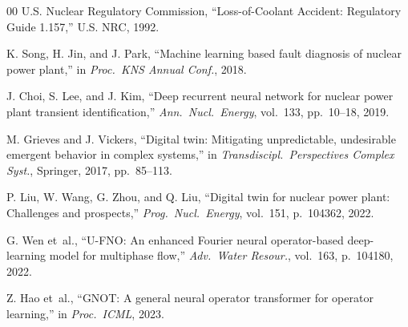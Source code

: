 \documentclass[conference]{IEEEtran}
\begin{document}
\begin{thebibliography}{00}
U.S. Nuclear Regulatory Commission,
``Loss-of-Coolant Accident: Regulatory Guide 1.157,''
U.S. NRC, 1992.

K. Song, H. Jin, and J. Park,
``Machine learning based fault diagnosis of nuclear power plant,''
in \textit{Proc.\ KNS Annual Conf.}, 2018.

J. Choi, S. Lee, and J. Kim,
``Deep recurrent neural network for nuclear power plant transient identification,''
\textit{Ann.\ Nucl.\ Energy}, vol.~133, pp.~10--18, 2019.

M. Grieves and J. Vickers,
``Digital twin: Mitigating unpredictable, undesirable emergent behavior in complex systems,''
in \textit{Transdiscipl.\ Perspectives Complex Syst.}, Springer, 2017, pp.~85--113.

P. Liu, W. Wang, G. Zhou, and Q. Liu,
``Digital twin for nuclear power plant: Challenges and prospects,''
\textit{Prog.\ Nucl.\ Energy}, vol.~151, p.~104362, 2022.

G. Wen et~al.,
``U-FNO: An enhanced Fourier neural operator-based deep-learning model for multiphase flow,''
\textit{Adv.\ Water Resour.}, vol.~163, p.~104180, 2022.

Z. Hao et~al.,
``GNOT: A general neural operator transformer for operator learning,''
in \textit{Proc.\ ICML}, 2023.

\end{thebibliography}
\end{document}

